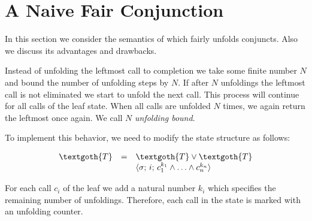 \section{A Naive Fair Conjunction}

In this section we consider the semantics of \mk which fairly unfolds conjuncts. Also we discuss its advantages and drawbacks.

Instead of unfolding the leftmost call to completion we take some finite number $N$ and bound the number of unfolding steps by $N$. If after $N$ unfoldings the leftmost
call is not eliminated we start to unfold the next call. This process will continue for all calls of the leaf state. When all calls are unfolded $N$ times, we again return the leftmost once
again. We call $N$ \emph{unfolding bound}.


To implement this behavior, we need to modify the state structure as follows:

\[
\begin{array}{rcl}
  \textgoth{T} &=& \textgoth{T} \lor \textgoth{T} \\
               & &\inbr{\sigma;\, i;\, c_1^{k_1} \land \ldots \land c_n^{k_n}} 
\end{array}
\]

For each call $c_i$ of the leaf we add a natural number $k_i$ which specifies the remaining number of unfoldings. Therefore, each call in the state is marked with an unfolding counter. 


